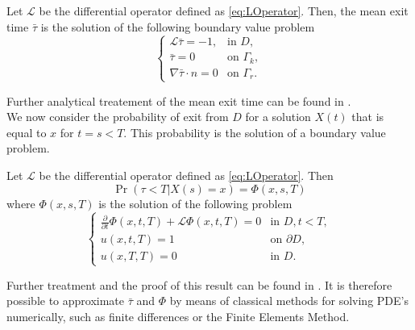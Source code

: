 \begin{theorem} Let $\mathcal L$ be the differential operator defined as \eqref{eq:LOperator}. Then, the mean exit time $\bar \tau$ is the solution of the following boundary value problem
\begin{equation}\label{eq:PDETau}
\begin{cases}
	\mathcal L \bar \tau = -1, & \text{in } D, \\
	\bar\tau = 0 & \text{on } \Gamma_k, \\
	\nabla \bar\tau \cdot n = 0 & \text{on } \Gamma_r.
\end{cases}
\end{equation}
\end{theorem}
Further analytical treatement of the mean exit time can be found in \cite{Krumscheid2015,Pavliotis2014}. \\
We now consider the probability of exit from $D$ for a solution $X(t)$ that is equal to $x$ for $t = s < T$. This probability is the solution of a boundary value problem.
\begin{theorem} Let $\mathcal L$ be the differential operator defined as \eqref{eq:LOperator}. Then
\begin{equation}\label{eq:ExitProbNotation}
	\Pr(\tau < T | X(s) = x) = \Phi(x,s,T) 
\end{equation}
where $\Phi(x,s,T)$ is the solution of the following problem
\begin{equation}\label{eq:PDEPhi}
\begin{cases}
	\frac{\partial}{\partial t} \Phi(x,t,T) + \mathcal L \Phi(x,t,T) = 0 & \text{in } D, t < T, \\
	u(x,t,T) = 1 & \text{on } \partial D, \\
	u(x,T,T) = 0 & \text{in } D.
\end{cases}
\end{equation}
\end{theorem}
Further treatment and the proof of this result can be found in \cite{Sirovich2010}. It is therefore possible to approximate $\bar\tau$ and $\Phi$ by means of classical methods for solving PDE's numerically, such as finite differences or the Finite Elements Method.

